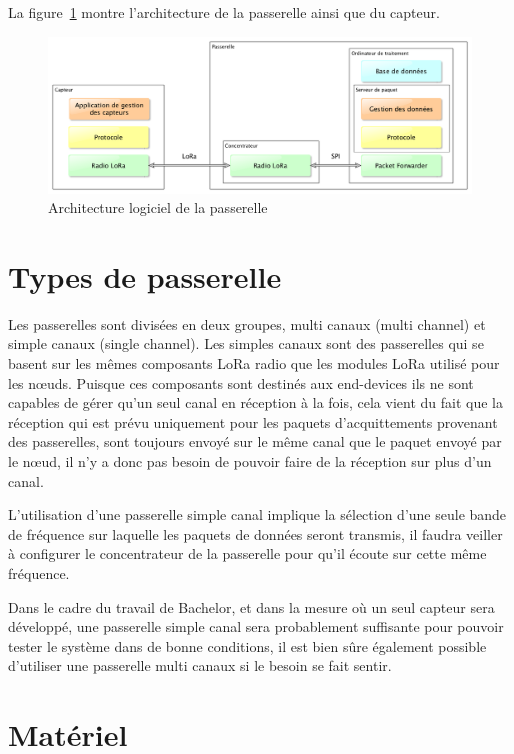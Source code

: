 La figure~\ref{fig:archi_passerelle} montre l'architecture de la passerelle ainsi que du capteur.

\begin{figure}[htb]
\centering 
\includegraphics[width=1\columnwidth]{../images/capteur_lora.png} 
\caption[Architecture passerelle]{Architecture logiciel de la passerelle}
\label{fig:archi_passerelle}
\end{figure}

\section{Types de passerelle}

Les passerelles sont divisées en deux groupes, multi canaux (multi channel) et simple canaux (single channel). Les simples canaux sont des passerelles qui se basent sur les mêmes composants LoRa radio que les modules LoRa utilisé pour les nœuds. Puisque ces composants sont destinés aux end-devices ils ne sont capables de gérer qu’un seul canal en réception à la fois, cela vient du fait que la réception qui est prévu uniquement pour les paquets d’acquittements provenant des passerelles, sont toujours envoyé sur le même canal que le paquet envoyé par le nœud, il n’y a donc pas besoin de pouvoir faire de la réception sur plus d’un canal.

L’utilisation d’une passerelle simple canal implique la sélection d’une seule bande de fréquence sur laquelle les paquets de données seront transmis, il faudra veiller à configurer le concentrateur de la passerelle pour qu’il écoute sur cette même fréquence.

Dans le cadre du travail de Bachelor, et dans la mesure où un seul capteur sera développé, une passerelle simple canal sera probablement suffisante pour pouvoir tester le système dans de bonne conditions, il est bien sûre également possible d’utiliser une passerelle multi canaux si le besoin se fait sentir.

\section{Matériel}

